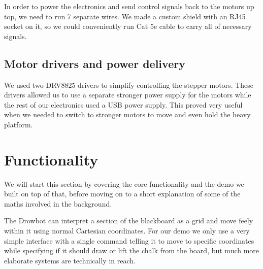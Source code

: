 \documentclass[a4paper,10pt]{article}
\begin{document}
In order to power the electronics and send control signals back to the
motors up top, we need to run 7 separate wires. We made a
custom shield with an RJ45 socket on it, so we could conveniently run Cat 5e
cable to carry all of necessary signals.

\subsection*{Motor drivers and power delivery}

We used two DRV8825 drivers to simplify controlling the stepper motors.
These drivers allowed us to use a separate stronger power supply for
the motors while the rest of our electronics used a USB power supply.
This proved very useful when we needed to switch to stronger motors
to move and even hold the heavy platform.

\section{Functionality}
\label{sec:functionality}

We will start this section by covering the core functionality and the
demo we built on top of that, before moving on to a short explanation
of some of the maths involved in the background.

The Drowbot can interpret a section of the blackboard as a grid
and move feely within it using normal Cartesian coordinates.
For our demo we only use a very simple interface with a single
command telling it to move to specific coordinates while specifying
if it should draw or lift the chalk from the board, but much more
elaborate systems are technically in reach.

\end{document}
